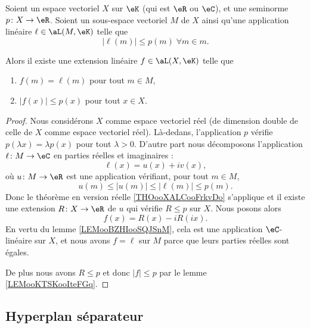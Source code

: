 \begin{theorem}		\label{THOooVQLJooWuBMoZ}
	Soient un espace vectoriel \( X\) sur \( \eK\) (qui est \( \eR\) ou \( \eC\)), et une seminorme \(p \colon X\to \eR  \). Soient un sous-espace vectoriel \( M\) de \( X\) ainsi qu'une application linéaire \( \ell\in\aL(M,\eK)\) telle que
	\begin{equation}
		| \ell(m) |\leq p(m)\;\forall m\in m.
	\end{equation}

	Alors il existe une extension linéaire \( f\in\aL(X,\eK)\) telle que
	\begin{enumerate}
		\item
		      \( f(m)=\ell(m)\) pour tout \( m\in M\),
		\item
		      \( | f(x) |\leq p(x)\) pour tout \( x\in X\).
	\end{enumerate}
\end{theorem}

\begin{proof}
	Nous considérons \( X\) comme espace vectoriel réel (de dimension double de celle de \( X\) comme espace vectoriel réel). Là-dedans, l'application \( p\) vérifie \( p(\lambda x)=\lambda p(x)\) pour tout \( \lambda>0\). D'autre part nous décomposons l'application \(\ell \colon M\to \eC  \) en parties réelles et imaginaires :
	\begin{equation}
		\ell(x)=u(x)+iv(x),
	\end{equation}
	où \(u \colon M\to \eR  \) est une application vérifiant, pour tout \( m\in M\),
	\begin{equation}
		u(m)\leq | u(m) |\leq | \ell(m) |\leq p(m).
	\end{equation}
	Donc le théorème en version réelle \ref{THOooXALCooFrkvDo} s'applique et il existe une extension \(R \colon X\to \eR  \) de \( u\) qui vérifie \( R\leq p\) sur \( X\). Nous posons alors
	\begin{equation}
		f(x)=R(x)-iR(ix).
	\end{equation}
	En vertu du lemme \ref{LEMooBZHIooSQJSnM}, cela est une application \( \eC\)-linéaire sur \( X\), et nous avons \( f=\ell\) sur \( M\) parce que leurs parties réelles sont égales.

	De plus nous avons \( R\leq p\) et donc \( | f |\leq p\) par le lemme \ref{LEMooKTSKooIteFGq}.
\end{proof}

\subsection{Hyperplan séparateur}


